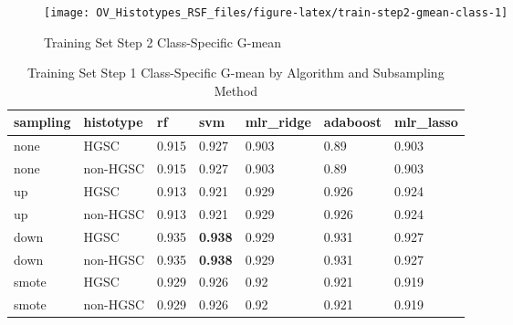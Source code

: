 \documentclass[
]{report}
\begin{document}
\begin{figure}[H]

{\centering \texttt{[image: OV\_Histotypes\_RSF\_files/figure-latex/train-step2-gmean-class-1]} 

}

\caption{Training Set Step 2 Class-Specific G-mean}\label{fig:train-step2-gmean-class}
\end{figure}

\begin{table}

\caption{\label{tab:train-step1-gmean-class-table}Training Set Step 1 Class-Specific G-mean by Algorithm and Subsampling Method}
\centering
\begin{tabular}[t]{l|l|l|l|l|l|l}
\hline
sampling & histotype & rf & svm & mlr\_ridge & adaboost & mlr\_lasso\\
\hline
none & HGSC & 0.915 & 0.927 & 0.903 & 0.89 & 0.903\\
\hline
none & non-HGSC & 0.915 & 0.927 & 0.903 & 0.89 & 0.903\\
\hline
up & HGSC & 0.913 & 0.921 & 0.929 & 0.926 & 0.924\\
\hline
up & non-HGSC & 0.913 & 0.921 & 0.929 & 0.926 & 0.924\\
\hline
down & HGSC & 0.935 & \textbf{0.938} & 0.929 & 0.931 & 0.927\\
\hline
down & non-HGSC & 0.935 & \textbf{0.938} & 0.929 & 0.931 & 0.927\\
\hline
smote & HGSC & 0.929 & 0.926 & 0.92 & 0.921 & 0.919\\
\hline
smote & non-HGSC & 0.929 & 0.926 & 0.92 & 0.921 & 0.919\\
\hline
\end{tabular}
\end{table}
\end{document}

